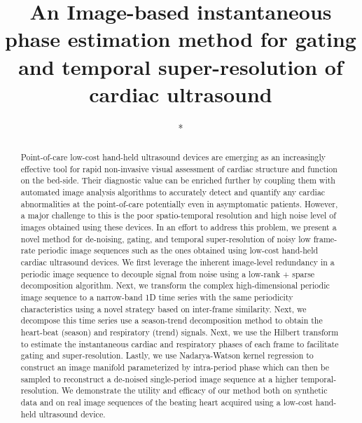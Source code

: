 \documentclass[runningheads,a4paper]{llncs}
\begin{document}
\mainmatter  %

\title{An Image-based instantaneous phase estimation method for gating and temporal super-resolution of cardiac ultrasound}


%
%

\author{*}
\authorrunning{*}   
\tocauthor{*}
\institute{*}

\maketitle

\begin{abstract}
Point-of-care low-cost hand-held ultrasound devices are emerging as an increasingly effective tool for rapid non-invasive visual assessment of cardiac structure and function on the bed-side. Their diagnostic value can be enriched further by coupling them with automated image analysis algorithms to accurately detect and quantify any cardiac abnormalities at the point-of-care potentially even in asymptomatic patients. However, a major challenge to this is the poor spatio-temporal resolution and high noise level of images obtained using these devices. In an effort to address this problem, we present a novel method for de-noising, gating, and temporal super-resolution of noisy low frame-rate periodic image sequences such as the ones obtained using low-cost hand-held cardiac ultrasound devices. We first leverage the inherent image-level redundancy in a periodic image sequence to decouple signal from noise using a low-rank + sparse decomposition algorithm. Next, we transform the complex high-dimensional periodic image sequence to a narrow-band 1D time series with the same periodicity characteristics using a novel strategy based on inter-frame similarity. Next, we decompose this time series use a season-trend decomposition method to obtain the heart-beat (season) and respiratory (trend) signals. Next, we use the Hilbert transform to estimate the instantaneous cardiac and respiratory phases of each frame to facilitate gating and super-resolution. Lastly, we use Nadarya-Watson kernel regression to construct an image manifold parameterized by intra-period phase which can then be sampled to reconstruct a de-noised single-period image sequence at a higher temporal-resolution. We demonstrate the utility and efficacy of our method both on synthetic data and on real image sequences of the beating heart acquired using a low-cost hand-held ultrasound device.
\end{abstract}
\vspace{-0.5cm}
\end{document}
